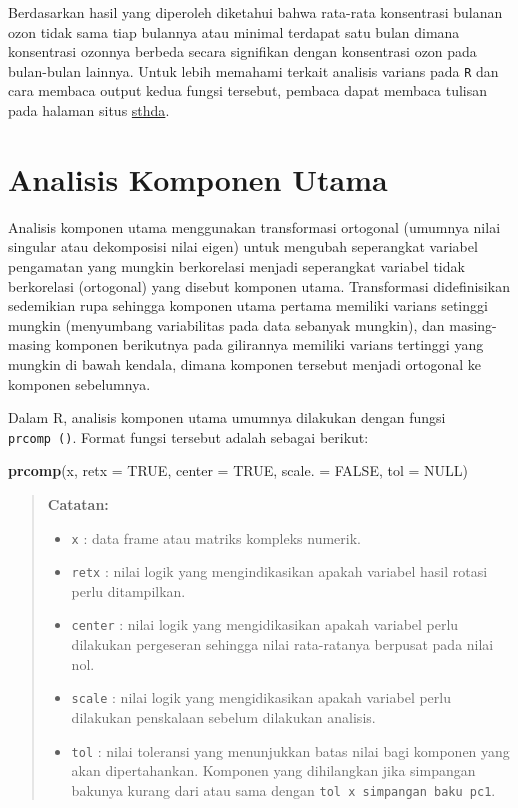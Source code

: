 \documentclass[]{book}
\newenvironment{Shaded}{\begin{snugshade}}{\end{snugshade}}
\newcommand{\DataTypeTok}[1]{\textcolor[rgb]{0.13,0.29,0.53}{#1}}
\newcommand{\KeywordTok}[1]{\textcolor[rgb]{0.13,0.29,0.53}{\textbf{#1}}}
\newcommand{\NormalTok}[1]{#1}
\newcommand{\OtherTok}[1]{\textcolor[rgb]{0.56,0.35,0.01}{#1}}
\providecommand{\tightlist}{%
  \setlength{\itemsep}{0pt}\setlength{\parskip}{0pt}}
\theoremstyle{definition}
\theoremstyle{definition}
\theoremstyle{definition}
\theoremstyle{remark}
\begin{document}
Berdasarkan hasil yang diperoleh diketahui bahwa rata-rata konsentrasi bulanan ozon tidak sama tiap bulannya atau minimal terdapat satu bulan dimana konsentrasi ozonnya berbeda secara signifikan dengan konsentrasi ozon pada bulan-bulan lainnya. Untuk lebih memahami terkait analisis varians pada \texttt{R} dan cara membaca output kedua fungsi tersebut, pembaca dapat membaca tulisan pada halaman situs \href{http://www.sthda.com/english/wiki/comparing-means-in-r}{sthda}.

\hypertarget{analisis-komponen-utama}{%
\section{Analisis Komponen Utama}\label{analisis-komponen-utama}}

Analisis komponen utama menggunakan transformasi ortogonal (umumnya nilai singular atau dekomposisi nilai eigen) untuk mengubah seperangkat variabel pengamatan yang mungkin berkorelasi menjadi seperangkat variabel tidak berkorelasi (ortogonal) yang disebut komponen utama. Transformasi didefinisikan sedemikian rupa sehingga komponen utama pertama memiliki varians setinggi mungkin (menyumbang variabilitas pada data sebanyak mungkin), dan masing-masing komponen berikutnya pada gilirannya memiliki varians tertinggi yang mungkin di bawah kendala, dimana komponen tersebut menjadi ortogonal ke komponen sebelumnya.

Dalam R, analisis komponen utama umumnya dilakukan dengan fungsi \texttt{prcomp\ ()}. Format fungsi tersebut adalah sebagai berikut:

\begin{Shaded}
\begin{Highlighting}[]
\KeywordTok{prcomp}\NormalTok{(x, }\DataTypeTok{retx =} \OtherTok{TRUE}\NormalTok{, }\DataTypeTok{center =} \OtherTok{TRUE}\NormalTok{, }\DataTypeTok{scale. =} \OtherTok{FALSE}\NormalTok{,}
       \DataTypeTok{tol =} \OtherTok{NULL}\NormalTok{)}
\end{Highlighting}
\end{Shaded}

\begin{quote}
\textbf{Catatan:}

\begin{itemize}
\tightlist
\item
  \texttt{x} : data frame atau matriks kompleks numerik.
\item
  \texttt{retx} : nilai logik yang mengindikasikan apakah variabel hasil rotasi perlu ditampilkan.
\item
  \texttt{center} : nilai logik yang mengidikasikan apakah variabel perlu dilakukan pergeseran sehingga nilai rata-ratanya berpusat pada nilai nol.
\item
  \texttt{scale} : nilai logik yang mengidikasikan apakah variabel perlu dilakukan penskalaan sebelum dilakukan analisis.
\item
  \texttt{tol} : nilai toleransi yang menunjukkan batas nilai bagi komponen yang akan dipertahankan. Komponen yang dihilangkan jika simpangan bakunya kurang dari atau sama dengan \texttt{tol\ x\ simpangan\ baku\ pc1}.
\end{itemize}
\end{quote}
\end{document}
